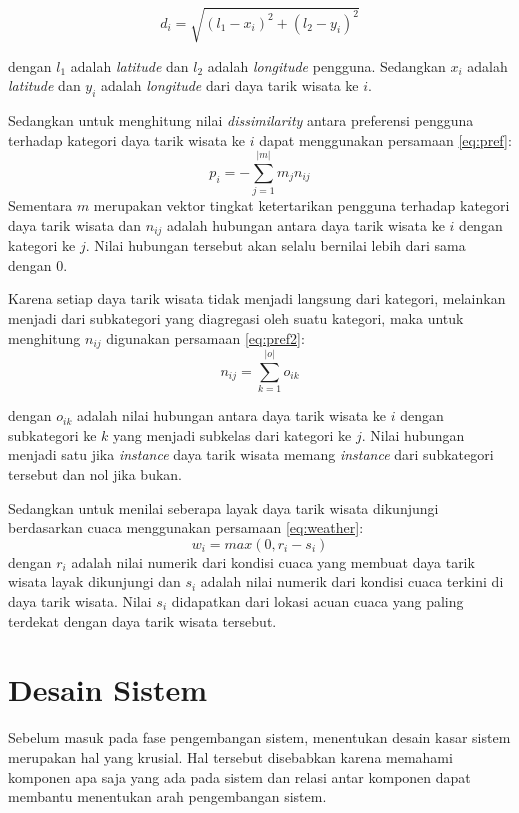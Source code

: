 \begin{enumerate}
\begin{equation}
d_i = \sqrt{(l_1 - x_i)^2 + (l_2 - y_i)^2}
\label{eq:euclidean} 
\end{equation}
\par
dengan $l_1$ adalah \textit{latitude} dan $l_2$ adalah \textit{longitude} pengguna. Sedangkan $x_i$ adalah \textit{latitude} dan $y_i$ adalah \textit{longitude} dari
daya tarik wisata ke $i$.
\par
Sedangkan untuk menghitung nilai \textit{dissimilarity} antara preferensi pengguna terhadap kategori daya tarik wisata ke $i$ dapat menggunakan persamaan \ref{eq:pref}:
\begin{equation}
p_i = -\sum_{j=1}^{|m|} m_j n_{ij}
\label{eq:pref} 
\end{equation}
Sementara $m$ merupakan vektor tingkat ketertarikan pengguna terhadap kategori daya tarik wisata 
dan $n_{ij}$ adalah hubungan antara daya tarik wisata ke $i$ dengan kategori ke $j$. Nilai hubungan tersebut akan selalu bernilai lebih dari sama dengan 0.
\par
Karena setiap daya tarik wisata tidak menjadi  langsung dari kategori, melainkan menjadi  dari subkategori yang diagregasi oleh suatu kategori,
maka untuk menghitung $n_{ij}$ digunakan persamaan \ref{eq:pref2}:
\begin{equation}
n_{ij} = \sum_{k=1}^{|o|} o_{ik}
\label{eq:pref2} 
\end{equation}
\par
dengan $o_{ik}$ adalah nilai hubungan antara daya tarik wisata ke $i$ dengan subkategori ke $k$ yang menjadi subkelas dari kategori ke $j$. Nilai hubungan menjadi satu jika
\textit{instance} daya tarik wisata memang \textit{instance} dari subkategori tersebut dan nol jika bukan.
\par
Sedangkan untuk menilai seberapa layak daya tarik wisata dikunjungi berdasarkan cuaca menggunakan persamaan \ref{eq:weather}:
\begin{equation}
w_i = max(0, r_i - s_i)
\label{eq:weather} 
\end{equation}
dengan $r_i$ adalah nilai numerik dari kondisi cuaca yang membuat daya tarik wisata layak dikunjungi dan $s_i$ adalah nilai numerik dari kondisi cuaca terkini di daya tarik wisata. Nilai $s_i$
didapatkan dari lokasi acuan cuaca yang paling terdekat dengan daya tarik wisata tersebut.

\end{enumerate}

\section{Desain Sistem}
Sebelum masuk pada fase pengembangan sistem, menentukan desain kasar sistem merupakan hal yang krusial. Hal tersebut disebabkan karena memahami komponen apa saja yang ada pada sistem dan relasi antar komponen dapat membantu menentukan arah pengembangan sistem. 

